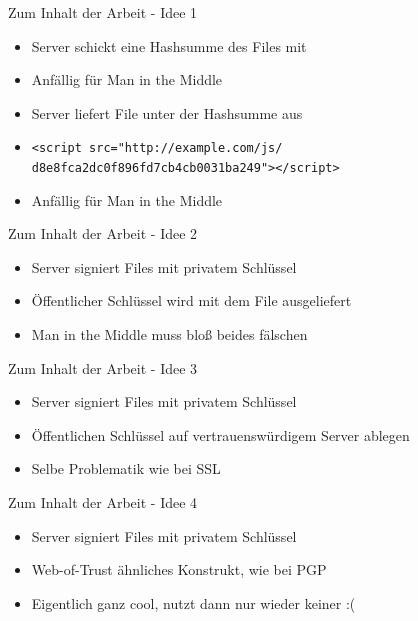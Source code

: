 \documentclass{beamer}
\begin{document}
\begin{frame}{Zum Inhalt der Arbeit - Idee 1}
  \begin{itemize}
    \item Server schickt eine Hashsumme des Files mit
    \item Anfällig für Man in the Middle
  \end{itemize}
  \begin{itemize}
    \item Server liefert File unter der Hashsumme aus
    \item \texttt{<script src="{}http://example.com/js/ d8e8fca2dc0f896fd7cb4cb0031ba249"{}></script>}
    \item Anfällig für Man in the Middle
  \end{itemize}
\end{frame}

\begin{frame}{Zum Inhalt der Arbeit - Idee 2}
  \begin{itemize}
    \item Server signiert Files mit privatem Schlüssel
    \item Öffentlicher Schlüssel wird mit dem File ausgeliefert
    \item Man in the Middle muss bloß beides fälschen
  \end{itemize}
\end{frame}

\begin{frame}{Zum Inhalt der Arbeit - Idee 3}
  \begin{itemize}
    \item Server signiert Files mit privatem Schlüssel
    \item Öffentlichen Schlüssel auf vertrauenswürdigem Server ablegen
    \item Selbe Problematik wie bei SSL
  \end{itemize}
\end{frame}

\begin{frame}{Zum Inhalt der Arbeit - Idee 4}
  \begin{itemize}
    \item Server signiert Files mit privatem Schlüssel
    \item Web-of-Trust ähnliches Konstrukt, wie bei PGP
    \item Eigentlich ganz cool, nutzt dann nur wieder keiner :(
  \end{itemize}
\end{frame}
\end{document}
